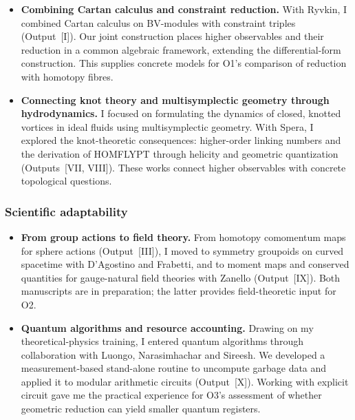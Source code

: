 \documentclass[a4paper,fontsize=11bp]{scrartcl}
\newenvironment{refsection}{\begingroup}{\endgroup}
\begin{document}
\begin{refsection}
\begin{itemize}
\item \textbf{Combining Cartan calculus and constraint reduction.}
With Ryvkin, I combined Cartan calculus on BV-modules with
constraint triples (Output~[I]). Our joint construction places higher
observables and their reduction in a common algebraic framework,
extending the differential-form construction. This supplies concrete
models for O1's comparison of reduction with homotopy fibres.

\item \textbf{Connecting knot theory and multisymplectic geometry through hydrodynamics.}
I focused on formulating the dynamics of closed, knotted vortices in
ideal fluids using multisymplectic geometry. With Spera, I explored the
knot-theoretic consequences: higher-order linking numbers and the
derivation of HOMFLYPT through helicity and geometric quantization
(Outputs~[VII, VIII]). These works connect higher observables with concrete
topological questions.
\end{itemize}
\subsubsection*{Scientific adaptability}

\begin{itemize}
\setlength{\itemsep}{0.15\baselineskip}
\setlength{\parsep}{0pt}

\item \textbf{From group actions to field theory.}
From homotopy comomentum maps for sphere actions (Output~[III]), I moved
to symmetry groupoids on curved spacetime with D'Agostino and Frabetti,
and to moment maps and conserved quantities for gauge-natural field
theories with Zanello (Output~[IX]). Both manuscripts are in preparation;
the latter provides field-theoretic input for O2.

\item \textbf{Quantum algorithms and resource accounting.}
Drawing on my theoretical-physics training, I entered quantum algorithms
through collaboration with Luongo, Narasimhachar and Sireesh.
We developed a measurement-based stand-alone routine to uncompute garbage data and applied it to modular arithmetic
circuits (Output~[X]). Working with explicit circuit gave me the
practical experience for O3's assessment of whether geometric reduction
can yield smaller quantum registers.
\end{itemize} 





\end{refsection}
\end{document}
